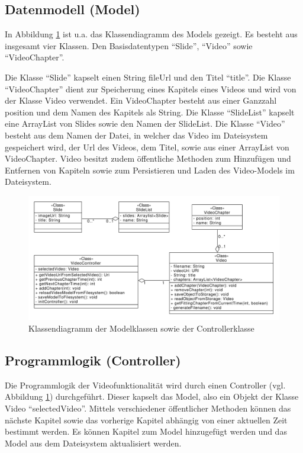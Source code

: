 \subsection{Datenmodell (Model)}
In Abbildung \ref{fig:Klassendiagramm} ist u.a. das Klassendiagramm des Models gezeigt. Es besteht aus insgesamt vier Klassen. Den Basisdatentypen \enquote{Slide}, \enquote{Video} sowie \enquote{VideoChapter}. 

Die Klasse \enquote{Slide} kapselt einen String fileUrl und den Titel \enquote{title}. 
Die Klasse \enquote{VideoChapter} dient zur Speicherung eines Kapitels eines Videos und wird von der Klasse Video verwendet. Ein VideoChapter besteht aus einer Ganzzahl position und dem Namen des Kapitels als String. 
Die Klasse \enquote{SlideList} kapselt eine ArrayList von Slides sowie den Namen der SlideList.
Die Klasse \enquote{Video} besteht aus dem Namen der Datei, in welcher das Video im Dateisystem gespeichert wird, der Url des Videos, dem Titel, sowie aus einer ArrayList von VideoChapter. Video besitzt zudem öffentliche Methoden zum Hinzufügen und Entfernen von Kapiteln sowie zum Persistieren und Laden des Video-Models im Dateisystem.
\begin{figure}[htbp]
    \centering
    \includegraphics[width=1\textwidth]{data/bilder/Klassendiagramm.pdf}
    \caption{Klassendiagramm der Modelklassen sowie der Controllerklasse}
    \label{fig:Klassendiagramm}
\end{figure}
%
%
\subsection{Programmlogik (Controller)}
Die Programmlogik der Videofunktionalität wird durch einen Controller (vgl. Abbildung \ref{fig:Klassendiagramm}) durchgeführt. Dieser kapselt das Model, also ein Objekt der Klasse Video \enquote{selectedVideo}. Mittels verschiedener öffentlicher Methoden können das nächste Kapitel sowie das vorherige Kapitel abhängig von einer aktuellen Zeit bestimmt werden. Es können Kapitel zum Model hinzugefügt werden und das Model aus dem Dateisystem aktualisiert werden.
